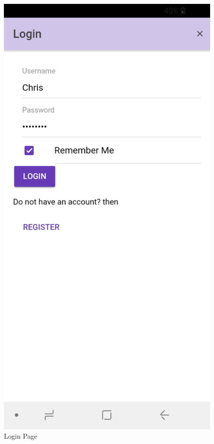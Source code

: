 \documentclass[12pt]{article}
\begin{document}
\begin{figure}[H]
\endminipage\hfill
{}
  \includegraphics[width=\linewidth]{figures/Login.jpg}
  \caption{Login Page}\label{fig:awesome_image2}
\endminipage\hfill
{}%

\end{figure}
\end{document}
